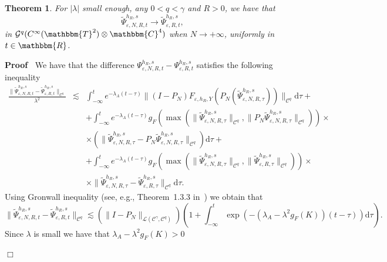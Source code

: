 \documentclass[11pt]{article}
\newcommand{\mathd}{\mathrm{d}}
\newenvironment{proof}{\noindent\textbf{Proof\ }}{\hspace*{\fill}$\Box$\medskip}
\newtheorem{theorem}{Theorem}
\begin{document}
\begin{theorem}
  \label{theorem_convergence1}For $| \lambda |$ small enough, any $0 < q <
  \gamma$ and $R > 0$, we have that
  \[ \tilde{\Psi}_{\varepsilon, N, R, t}^{h_R, s} \rightarrow
     \tilde{\Psi}_{\varepsilon, R, t}^{h_R, s}, \]
  in $\mathcal{G}^q (C^{\infty} (\mathbbm{T}^2) \otimes \mathbbm{C}^4)$ when $N
  \rightarrow + \infty$, uniformly in $t \in \mathbbm{R}$.
\end{theorem}

\begin{proof}
  We have that the difference $\Psi_{\varepsilon, N, R, t}^{h_R, s} -
  \Psi_{\varepsilon, R, t}^{h_R, s} $ satisfies the following inequality
  \begin{eqnarray}
    \frac{\| \tilde{\Psi}_{\varepsilon, N, R, t}^{h_R, s} -
    \tilde{\Psi}_{\varepsilon, R, t}^{h_R, s} \|_{\mathcal{C}^q}}{\lambda^2} &
    \lesssim & \int_{- \infty}^t e^{- \lambda_A (t - \tau)} \| (I - P_N)
    F_{\varepsilon, h_R, Y} (P_N (\tilde{\Psi}_{\varepsilon, N, R, \tau}^{h_R,
    s})) \|_{\mathcal{C}^q} \mathd \tau + \nonumber\\
    &  & + \int_{- \infty}^t e^{- \lambda_A (t - \tau)} g_F (\max (\|
    \tilde{\Psi}_{\varepsilon, N, R, \tau}^{h_R, s} \|_{\mathcal{C}^q}, \| P_N
    \tilde{\Psi}_{\varepsilon, N, R, \tau}^{h_R, s} \|_{\mathcal{C}^q}))
    \times \nonumber\\
    &  & \times (\| \tilde{\Psi}_{\varepsilon, N, R, \tau}^{h_R, s} - P_N
    \tilde{\Psi}_{\varepsilon, N, R, \tau}^{h_R, s} \|_{\mathcal{C}^q}) \mathd
    \tau + \nonumber\\
    &  & + \int_{- \infty}^t e^{- \lambda_A (t - \tau)} g_F (\max (\|
    \tilde{\Psi}_{\varepsilon, N, R, \tau}^{h_R, s} \|_{\mathcal{C}^q}, \|
    \tilde{\Psi}_{\varepsilon, R, \tau}^{h_R, s} \|_{\mathcal{C}^q})) \times
    \nonumber\\
    &  & \times \| \tilde{\Psi}_{\varepsilon, N, R, \tau}^{h_R, s} -
    \tilde{\Psi}_{\varepsilon, R, \tau}^{h_R, s} \|_{\mathcal{C}^q} \mathd
    \tau . \nonumber
  \end{eqnarray}
  Using Gronwall inequality (see, e.g., Theorem~1.3.3
  in~{\cite{Pachpatte1998}}) we obtain that
  \[ \| \tilde{\Psi}_{\varepsilon, N, R, t}^{h_R, s} -
     \tilde{\Psi}_{\varepsilon, R, t}^{h_R, s} \|_{\mathcal{C}^q} \lesssim (\|
     I - P_N \|_{\mathcal{L} (\mathcal{C}^{\gamma}, \mathcal{C}^q)}) \left( 1
     + \int_{- \infty}^t \exp (- (\lambda_A - \lambda^2 g_F (K)) (t - \tau))
     \mathd \tau \right) . \]
  Since $\lambda$ is small we have that $\lambda_A - \lambda^2 g_F (K) > 0$

\end{proof}
\end{document}

